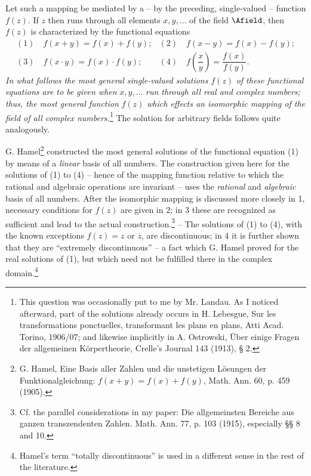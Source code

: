 \documentclass[11pt]{article}
\begin{document}
Let such a mapping be mediated by a -- by the preceding, single-valued -- function \(f(z)\). If \(z\) then runs through all elements \(x,y,\ldots\) of the field \(\Afield\), then \(f(z)\) is characterized by the functional equations
\[
\begin{array}{ll}
(1)\quad f(x+y)=f(x)+f(y); & (2)\quad f(x-y)=f(x)-f(y);\\[0.45em]
(3)\quad f(x\cdot y)=f(x)\cdot f(y); & (4)\quad f\!\left(\dfrac{x}{y}\right)=\dfrac{f(x)}{f(y)}.
\end{array}
\]
\emph{In what follows the most general single-valued solutions} \(f(z)\) \emph{of these functional equations are to be given when} \(x,y,\ldots\) \emph{run through all real and complex numbers; thus, the most general function} \(f(z)\) \emph{which effects an isomorphic mapping of the field of all complex numbers.}\footnote{This question was occasionally put to me by Mr. Landau. As I noticed afterward, part of the solutions already occurs in H. Lebesgue, Sur les transformations ponctuelles, transformant les plans en plans, Atti Acad. Torino, 1906/07; and likewise implicitly in A. Ostrowski, Über einige Fragen der allgemeinen Körpertheorie, Crelle's Journal 143 (1913), § 2.} The solution for arbitrary fields follows quite analogously.

G. Hamel\footnote{G. Hamel, Eine Basis aller Zahlen und die unstetigen Lösungen der Funktionalgleichung: \(f(x+y)=f(x)+f(y)\), Math. Ann. 60, p. 459 (1905).} constructed the most general solutions of the functional equation (1) by means of a \emph{linear} basis of all numbers. The construction given here for the solutions of (1) to (4) -- hence of the mapping function relative to which the rational and algebraic operations are invariant -- uses the \emph{rational} and \emph{algebraic} basis of all numbers. After the isomorphic mapping is discussed more closely in 1, necessary conditions for \(f(z)\) are given in 2; in 3 these are recognized as sufficient and lead to the actual construction.\footnote{Cf. the parallel considerations in my paper: Die allgemeinsten Bereiche aus ganzen transzendenten Zahlen. Math. Ann. 77, p. 103 (1915), especially §§ 8 and 10.} -- The solutions of (1) to (4), with the known exceptions \(f(z)=z\) or \(\overline z\), are discontinuous; in 4 it is further shown that they are ``extremely discontinuous'' -- a fact which G. Hamel proved for the real solutions of (1), but which need not be fulfilled there in the complex domain.\footnote{Hamel's term ``totally discontinuous'' is used in a different sense in the rest of the literature.}
\end{document}
